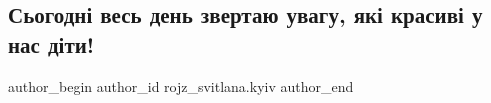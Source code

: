  
 
 
 
 
 
\subsection{Сьогодні весь день звертаю увагу, які красиві у нас діти!}
\label{sec:16_12_2022.fb.rojz_svitlana.kyiv.2.dity_krasyvi}
 
\ifcmt
 author_begin
   author_id rojz_svitlana.kyiv
 author_end
\fi
